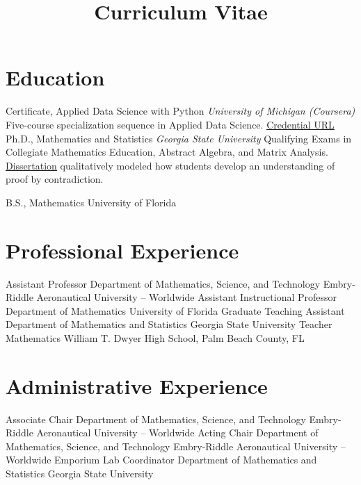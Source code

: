 \documentclass[10pt,a4paper,sans]{moderncv}
\title{Curriculum Vitae}
\begin{document}
	\makecvtitle
	\vspace*{-1cm}
	\section{Education}
	{Certificate, Applied Data Science with Python}
	{}{}
	{\textit{University of Michigan (Coursera)}}
	{ Five-course specialization sequence in Applied Data Science. 
		\href{https://www.coursera.org/account/accomplishments/specialization/certificate/7TEVNZ89JDDA}{\underline{Credential URL}}  
	}
	{}
	{Ph.D., Mathematics and Statistics}
	{}{}
	{\textit{Georgia State University}}
	{Qualifying Exams in Collegiate Mathematics Education, Abstract Algebra, and Matrix Analysis. \\ 
		\href{https://scholarworks.gsu.edu/math_diss/46/}{\underline{Dissertation}} qualitatively modeled how students develop an understanding of proof by contradiction. 
	}
	{}
	
	{B.S., Mathematics}
	{University of Florida}
	{}{}{}
	\section{Professional Experience}
	{Assistant Professor}
	{}
	{Department of Mathematics, Science, and Technology}
	{Embry-Riddle Aeronautical University -- Worldwide}
	{}
	{Assistant Instructional Professor}
	{}
	{Department of Mathematics}
	{University of Florida}
	{}
	{Graduate Teaching Assistant}
	{}
	{Department of Mathematics and Statistics}
	{Georgia State University}
	{}
	{Teacher}
	{}
	{Mathematics}
	{William T. Dwyer High School, Palm Beach County, FL}
	{} 
	\section{Administrative Experience}
	{Associate Chair}
	{}
	{Department of Mathematics, Science, and Technology}
	{Embry-Riddle Aeronautical University -- Worldwide}
	{}
	{Acting Chair}
	{}
	{Department of Mathematics, Science, and Technology}
	{Embry-Riddle Aeronautical University -- Worldwide}
	{}
	{Emporium Lab Coordinator}
	{}
	{Department of Mathematics and Statistics}
	{Georgia State University}
	{}
\end{document}
